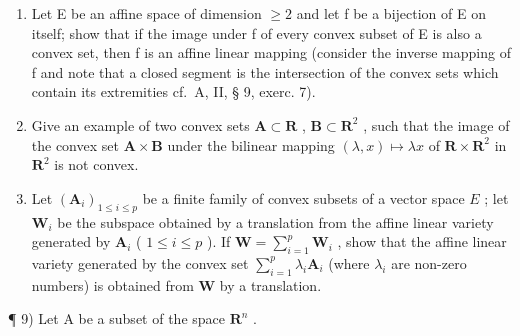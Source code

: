 \begin{enumerate}
\item
  Let E be an affine space of dimension \(\geqslant 2\) and let f be a bijection of E on itself; show that if the image under f of every convex subset of E is also a convex set, then f is an affine linear mapping (consider the inverse mapping of f and note that a closed segment is the intersection of the convex sets which contain its extremities cf.~A, II, § 9, exerc. 7).
\item
  Give an example of two convex sets \(\mathbf{A} \subset \mathbf{R}\) , \(\mathbf{B} \subset \mathbf{R}^2\) , such that the image of the convex set \(\mathbf{A} \times \mathbf{B}\) under the bilinear mapping \((\lambda, x) \mapsto \lambda x\) of \(\mathbf{R} \times \mathbf{R}^2\) in \(\mathbf{R}^2\) is not convex.
\item
  Let \((\mathbf{A}_i)_{1 \leqslant i \leqslant p}\) be a finite family of convex subsets of a vector space \(E\) ; let \(\mathbf{W}_i\) be the subspace obtained by a translation from the affine linear variety generated by \(\mathbf{A}_i\) ( \(1 \leqslant i \leqslant p\) ). If \(\mathbf{W} = \sum_{i=1}^{p} \mathbf{W}_i\) , show that the affine linear variety generated by the convex set \(\sum_{i=1}^{p} \lambda_i \mathbf{A}_i\) (where \(\lambda_i\) are non-zero numbers) is obtained from \(\mathbf{W}\) by a translation.
\end{enumerate}

¶ 9) Let A be a subset of the space \(\mathbf{R}^n\) .

